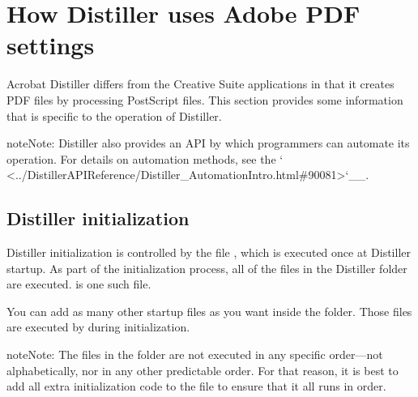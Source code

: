 \documentclass[letterpaper,12pt,english,openany,oneside]{sphinxmanual}
\begin{document}
\section{How Distiller uses Adobe PDF settings}
\label{\detokenize{index:how-distiller-uses-adobe-pdf-settings}}
Acrobat Distiller differs from the Creative Suite applications in that it creates PDF files by processing PostScript files. This section provides some information that is specific to the operation of Distiller.

\begin{sphinxadmonition}{note}{Note:}
Distiller also provides an API by which programmers can automate its operation. For details on automation methods, see the ` <../DistillerAPIReference/Distiller\_AutomationIntro.html\#90081>`\_\_.
\end{sphinxadmonition}


\subsection{Distiller initialization}
\label{\detokenize{index:distiller-initialization}}
Distiller initialization is controlled by the file  , which is executed once at Distiller startup. As part of the initialization process, all of the files in the Distiller  folder are executed.  is one such file.

You can add as many other startup files as you want inside the  folder. Those files are executed by  during initialization.

\begin{sphinxadmonition}{note}{Note:}
The files in the  folder are not executed in any specific order—not alphabetically, nor in any other predictable order. For that reason, it is best to add all extra initialization code to the  file to ensure that it all runs in order.
\end{sphinxadmonition}
\end{document}
